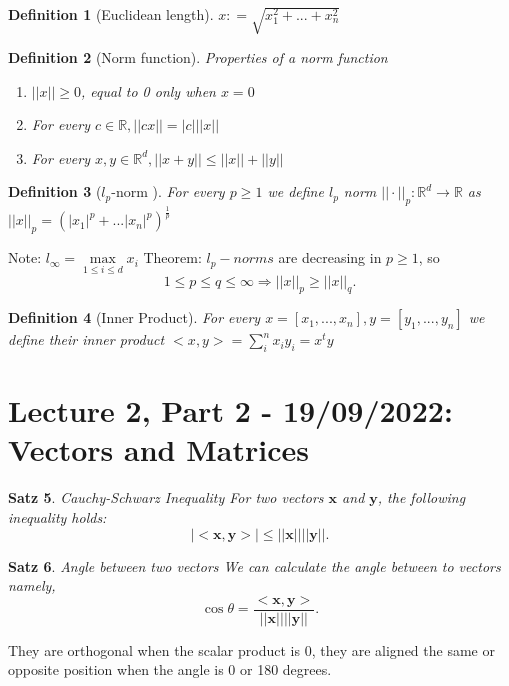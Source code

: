\documentclass[11pt]{article}
\newtheorem{theorem}{Satz}
\newtheorem{definition}[theorem]{Definition}
\begin{document}
\begin{definition}[Euclidean length]
    $x : = \sqrt{x_1^2 + ... + x_n^2}$ 
\end{definition}

\begin{definition}[Norm function] Properties of a norm function
    \begin{enumerate}
        \item $||x|| \geq 0$, equal to 0 only when $x = 0$
        \item For every $c\in \mathbb{R}, ||cx|| = |c|||x||$
        \item For every $x, y \in \mathbb{R}^d, ||x+y|| \leq ||x|| + ||y||$    
    \end{enumerate}
    
    
\end{definition}

\begin{definition}[$l_p$-norm ]
    For every $ p \geq 1 $ we define $l_p$ norm $|| \cdot ||_p : \mathbb{R}^d \to \mathbb{R}$ as $||x||_p = (|x_1|^p + ... |x_n|^p)^\frac{1}{p}$    
    
\end{definition}
Note: $l_\infty = \underset{1 \leq i \leq d}{\max}x_i$ 
\newline
Theorem: $l_p-norms$ are decreasing in $ p \geq 1$, so
\[
1 \leq p \leq q \leq \infty \Rightarrow ||x||_p \geq ||x||_q
.\]   

\begin{definition}[Inner Product]
    For every $ x = [x_1, ..., x_n], y = [y_1, ..., y_n ]$ we define their inner product $<x, y> = \sum_i^n x_i y_i = x^ty$  
\end{definition}

\section{Lecture 2, Part 2 - 19/09/2022: Vectors and Matrices}
\begin{theorem}Cauchy-Schwarz Inequality
    For two vectors $\textbf{x} $ and $\textbf{y} $, the following inequality holds:
    \[
    |<\textbf{x} ,\textbf{y} >| \leq ||\textbf{x} ||||\textbf{y} ||
    .\]    
\end{theorem}

\begin{theorem}Angle between two vectors
    We can calculate the angle between to vectors namely, \[
    \cos \theta = \frac{<\textbf{x},\textbf{y}>}{||\textbf{x}||||\textbf{y} || }
    .\] 
    
\end{theorem}
They are orthogonal when the scalar product is 0, they are aligned the same or opposite position when the angle is 0 or 180 degrees.
\end{document}

